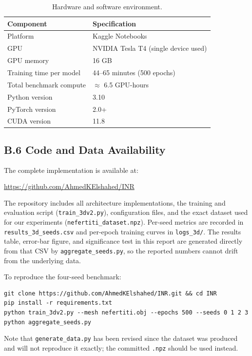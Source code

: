 \begin{table}[htbp]
\centering
\caption{Hardware and software environment.}
\label{tab:compute_env}
\begin{tabular}{ll}
\toprule
\textbf{Component} & \textbf{Specification} \\
\midrule
Platform & Kaggle Notebooks \\
GPU & NVIDIA Tesla T4 (single device used) \\
GPU memory & 16 GB \\
Training time per model & 44--65 minutes (500 epochs) \\
Total benchmark compute & $\approx$ 6.5 GPU-hours \\
Python version & 3.10 \\
PyTorch version & 2.0+ \\
CUDA version & 11.8 \\
\bottomrule
\end{tabular}
\end{table}

\subsection*{B.6 Code and Data Availability}

The complete implementation is available at:

\url{https://github.com/AhmedKElshahed/INR}

The repository includes all architecture implementations, the training and evaluation script (\texttt{train\_3dv2.py}), configuration files, and the exact dataset used for our experiments (\texttt{nefertiti\_dataset.npz}). Per-seed metrics are recorded in \texttt{results\_3d\_seeds.csv} and per-epoch training curves in \texttt{logs\_3d/}. The results table, error-bar figure, and significance test in this report are generated directly from that CSV by \texttt{aggregate\_seeds.py}, so the reported numbers cannot drift from the underlying data.

To reproduce the four-seed benchmark:

\begin{verbatim}
git clone https://github.com/AhmedKElshahed/INR.git && cd INR
pip install -r requirements.txt
python train_3dv2.py --mesh nefertiti.obj --epochs 500 --seeds 0 1 2 3
python aggregate_seeds.py
\end{verbatim}

Note that \texttt{generate\_data.py} has been revised since the dataset was produced and will not reproduce it exactly; the committed \texttt{.npz} should be used instead.